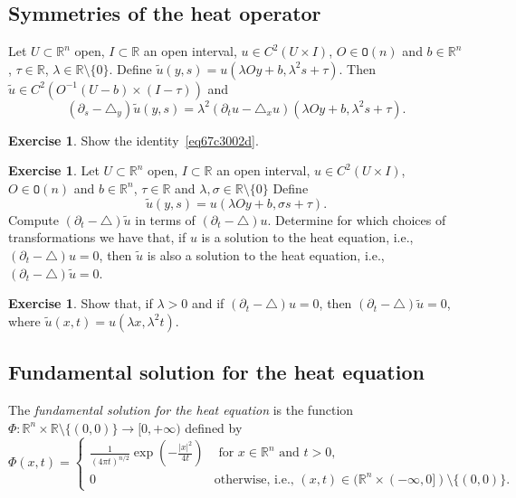 \documentclass[a4paper,9pt]{amsart}
\newcommand{\R}{\mathbb{R}}	%
\newcommand{\de}{\partial}		%
\newcommand{\Orth}{\mathtt{O}} %
\newcommand{\laplacian}{\triangle}
\theoremstyle{plain}
\theoremstyle{definition}
\newtheorem{exercise}[proposition]{Exercise}%
\theoremstyle{remark}
\begin{document}
\subsection{Symmetries of the heat operator}\label{subs67d16430}
Let $U\subset\R^n$ open, $I\subset\R$ an open interval, $u\in C^2(U\times I)$, $O\in\Orth(n)$ and $b\in\R^n$, $\tau\in\R$, $\lambda\in\R\setminus\{0\}$.
Define $\tilde  u(y,s) = u(\lambda Oy+b,\lambda^2s+\tau)$.
Then $\tilde u\in C^2(O^{-1}(U-b)\times (I-\tau))$ and
\begin{equation}\label{eq67c3002d}
	(\de_s - \laplacian_y) \tilde u(y,s) = \lambda^2 (\de_tu - \laplacian_x u)(\lambda Oy+b, \lambda^2 s+\tau).
\end{equation}

\begin{exercise}
	Show the identity~\eqref{eq67c3002d}.
\end{exercise}

\begin{exercise}
	Let $U\subset\R^n$ open, $I\subset\R$ an open interval, $u\in C^2(U\times I)$, $O\in\Orth(n)$ and $b\in\R^n$, $\tau\in\R$ and $\lambda,\sigma\in\R\setminus\{0\}$
	Define 
	\[
	\tilde  u(y,s) = u(\lambda Oy+b,\sigma s+\tau) .
	\]
	Compute $(\de_t - \laplacian) \tilde u$ in terms of $(\de_t - \laplacian) u$.
	Determine for which choices of transformations we have that, if $u$ is a solution to the heat equation, i.e., $(\de_t - \laplacian) u=0$, then $\tilde u$ is also a solution to the heat equation, i.e., $(\de_t - \laplacian) \tilde u=0$.
\end{exercise}

\begin{exercise}
	Show that, if $\lambda>0$ and if $(\de_t - \laplacian) u=0$, 
	then $(\de_t - \laplacian) \tilde u=0$,
	where $\tilde u(x,t) = u(\lambda x,\lambda^2 t)$.
\end{exercise}

\subsection{Fundamental solution for the heat equation}\label{subs67c6d9a8}

The \emph{fundamental solution for the heat equation} is the function 
$\Phi:\R^n\times\R\setminus\{(0,0)\} \to [0,+\infty)$ defined by
\begin{equation}\label{eq67c3022e} %
	\Phi(x,t) = \begin{cases}
	\frac{1}{(4\pi t)^{n/2}} \exp\left( -\frac{|x|^2}{4t} \right)
		& \text{ for $x\in\R^n$ and $t>0$,} \\
	0 & \text{otherwise, i.e., }(x,t)\in(\R^n\times(-\infty,0])\setminus\{(0,0)\} .
	\end{cases}
\end{equation}%
\end{document}
